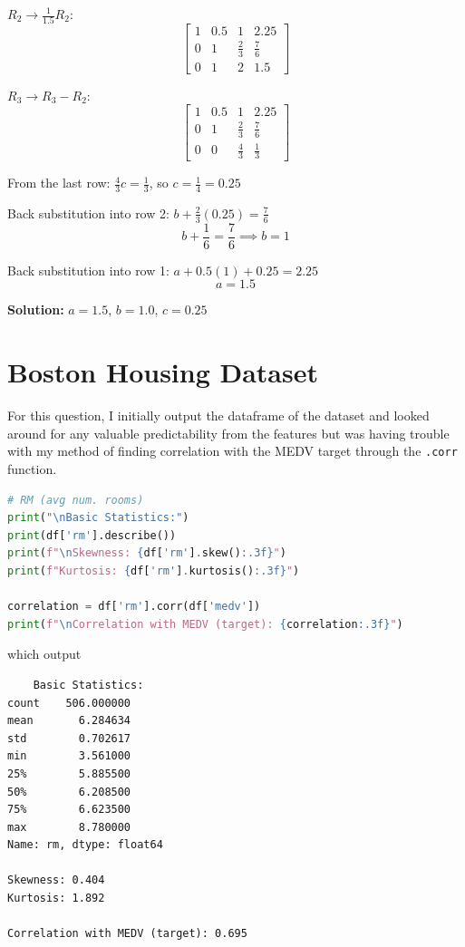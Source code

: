 \documentclass[12pt]{article}
\begin{document}
$R_2 \to \frac{1}{1.5}R_2$:
\[
\left[\begin{array}{ccc|c}
1 & 0.5 & 1 & 2.25 \\
0 & 1 & \frac{2}{3} & \frac{7}{6} \\
0 & 1 & 2 & 1.5
\end{array}\right]
\]

$R_3 \to R_3 - R_2$:
\[
\left[\begin{array}{ccc|c}
1 & 0.5 & 1 & 2.25 \\
0 & 1 & \frac{2}{3} & \frac{7}{6} \\
0 & 0 & \frac{4}{3} & \frac{1}{3}
\end{array}\right]
\]

From the last row: $\frac{4}{3}c = \frac{1}{3}$, so $c = \frac{1}{4} = 0.25$

Back substitution into row 2: $b + \frac{2}{3}(0.25) = \frac{7}{6}$
\[
b + \frac{1}{6} = \frac{7}{6} \implies b = 1
\]

Back substitution into row 1: $a + 0.5(1) + 0.25 = 2.25$
\[
a = 1.5
\]

\textbf{Solution:} $a = 1.5$, $b = 1.0$, $c = 0.25$

\section{Boston Housing Dataset}

For this question, I initially output the dataframe of the dataset and looked around for any valuable predictability from the features
but was having trouble with my method of finding correlation with the MEDV target through the \lstinline{.corr} function. 
\begin{lstlisting}[language=Python]
# RM (avg num. rooms)
print("\nBasic Statistics:")
print(df['rm'].describe())
print(f"\nSkewness: {df['rm'].skew():.3f}")
print(f"Kurtosis: {df['rm'].kurtosis():.3f}")

correlation = df['rm'].corr(df['medv'])
print(f"\nCorrelation with MEDV (target): {correlation:.3f}")
\end{lstlisting}

which output

\begin{lstlisting}
    Basic Statistics:
count    506.000000
mean       6.284634
std        0.702617
min        3.561000
25%        5.885500
50%        6.208500
75%        6.623500
max        8.780000
Name: rm, dtype: float64

Skewness: 0.404
Kurtosis: 1.892

Correlation with MEDV (target): 0.695
\end{lstlisting}
\end{document}
